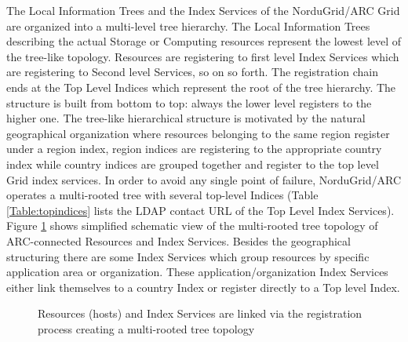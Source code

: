 \documentclass{article}
\begin{document}
The Local Information Trees and the Index Services of the NorduGrid/ARC Grid are
organized into a multi-level tree hierarchy. The Local Information Trees describing the
actual Storage or Computing resources represent the lowest level of the tree-like
topology. Resources are registering to first level Index Services which are registering to
Second level Services, so on so forth. The registration chain ends at 
the Top Level Indices which represent the root of the tree hierarchy. 
The structure is built from bottom to top: always the lower level registers to 
the higher one. The tree-like hierarchical structure is motivated by  the 
natural geographical organization where resources belonging to the same 
region register under a region index, region indices are registering to
the appropriate country index while country indices are grouped
together and register to the top level Grid index services. 
In order to avoid any single point of failure, NorduGrid/ARC operates a
multi-rooted tree with several top-level Indices (Table \ref{Table:topindices}
lists the LDAP contact URL of the Top Level Index Services).
Figure \ref{fig:index_tree} shows simplified schematic view of the multi-rooted 
tree topology of  ARC-connected Resources and Index Services.
Besides the geographical structuring there are some Index Services which 
group resources by specific application area or organization. These 
application/organization Index Services either link themselves to a country Index or 
register directly to a Top level Index. 

\begin{figure}[hb]
\centering
{ 
{}
}
\caption{\label{fig:index_tree} Resources (hosts) and Index Services are
linked via the registration process creating a multi-rooted tree topology}
\end{figure}
\end{document}
